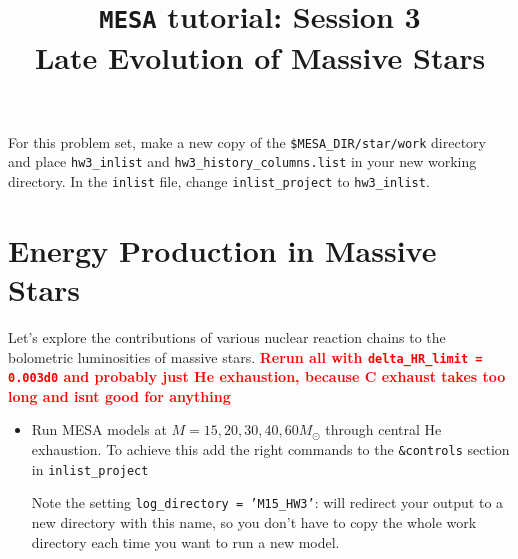 \documentclass[11pt,a4paper]{article}
\newcommand{\todo}[1]{\textbf{\textcolor{red}{#1}}}
\begin{document}
\title{
    \textbf{\texttt{MESA} tutorial:  Session 3} \\
    \textbf{\Large Late Evolution of Massive Stars}
}
\date{}
\maketitle
\vspace{-1cm}


For this problem set, make a new copy of the \texttt{\$MESA\_DIR/star/work} 
directory and place \texttt{hw3\_inlist} and \texttt{hw3\_history\_columns.list} in your new working directory.
In the \texttt{inlist} file, change \texttt{inlist\_project} to \texttt{hw3\_inlist}.

\section{Energy Production in Massive Stars}

Let's explore the contributions of various nuclear reaction chains to the bolometric luminosities of massive stars.
\todo{Rerun all with \texttt{delta\_HR\_limit = 0.003d0} and probably just He exhaustion, because C exhaust takes too long and isnt good for anything }

\begin{itemize}
    \item Run MESA models at $M = 15, 20, 30, 40, 60 M_\odot$ through central He exhaustion.
    To achieve this add the right commands to the \texttt{\&controls} section in \texttt{inlist\_project}
    
    Note the setting \texttt{log\_directory = 'M15\_HW3'}: will redirect your output to a new directory with this name, so you don't have to copy the whole work directory each time you want to run a new model.
    
\end{itemize}
\end{document}
